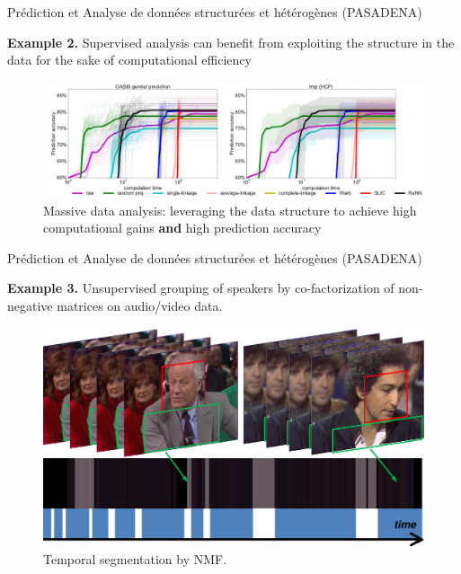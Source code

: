 \begin{frame}{Prédiction et Analyse de données structurées et hétérogènes (PASADENA) }

\textbf{Example 2.} Supervised analysis can benefit from exploiting the structure in the data for the sake of computational efficiency

\begin{figure}
\includegraphics[trim = 0mm 0mm 0mm 0mm, clip = TRUE, width=1\linewidth]{Images/computation_time.png}
\caption{Massive data analysis: leveraging the data structure to achieve high computational gains \textbf{and} high prediction accuracy}
\label{comp_time}
\end{figure}
\end{frame}

\begin{frame}{Prédiction et Analyse de données structurées et hétérogènes (PASADENA) }

\textbf{Example 3.} Unsupervised grouping of speakers by co-factorization of non-negative matrices on audio/video data.

\vspace{1cm}
\begin{figure}
\includegraphics[trim = 0mm 0mm 0mm 0mm, clip = TRUE, width=.75\linewidth]{Images/2_speaker_turns.pdf}
\caption{Temporal segmentation by NMF.}
\end{figure}

\end{frame}

